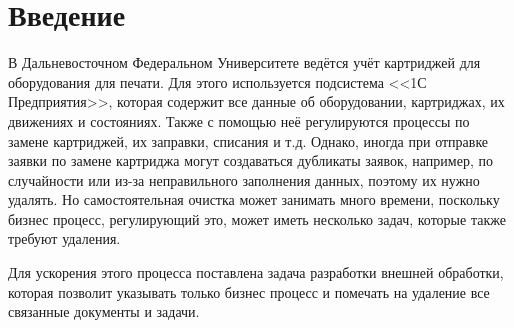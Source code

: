 \section{Введение}
    В Дальневосточном Федеральном Университете ведётся учёт картриджей для оборудования для печати. Для этого используется подсистема <<1С Предприятия>>, которая содержит все данные об оборудовании, картриджах, их движениях и состояниях. Также с помощью неё регулируются процессы по замене картриджей, их заправки, списания и т.д. Однако, иногда при отправке заявки по замене картриджа могут создаваться дубликаты заявок, например, по случайности или из-за неправильного заполнения данных, поэтому их нужно удалять. Но самостоятельная очистка может занимать много времени, поскольку бизнес процесс, регулирующий это, может иметь несколько задач, которые также требуют удаления.

    Для ускорения этого процесса поставлена задача разработки внешней обработки, которая позволит указывать только бизнес процесс и помечать на удаление все связанные документы и задачи.